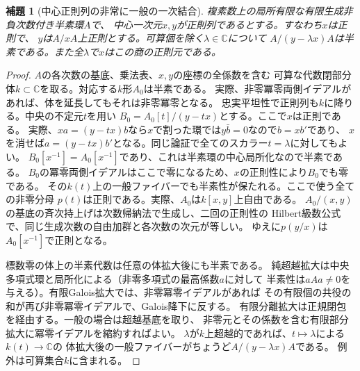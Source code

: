 \documentclass[11pt,a4paper]{ltjsarticle}
\newtheorem{lemma}[theorem]{補題}
\theoremstyle{definition}
\begin{document}
\begin{lemma}[中心正則列の非常に一般の一次結合]
\label{lem:ou-very-general-semiprime-pencil}
複素数上の局所有限な有限生成非負次数付き半素環$A$で、
中心一次元$x,y$が正則列であるとする。すなわち$x$は正則で、
$y$は$A/xA$上正則とする。可算個を除く$\lambda\in\mathbb C$について
$A/(y-\lambda x)A$は半素である。また全$\lambda$で$x$はこの商の正則元である。
\end{lemma}
\begin{proof}
$A$の各次数の基底、乗法表、$x,y$の座標の全係数を含む
可算な代数閉部分体$k\subset\mathbb C$を取る。対応する$k$形$A_0$は半素である。
実際、非零冪零両側イデアルがあれば、体を延長してもそれは非零冪零となる。
忠実平坦性で正則列も$k$に降りる。中央の不定元$t$を用い
$B_0=A_0[t]/(y-tx)$とする。ここで$x$は正則である。
実際、$xa=(y-tx)b$なら$x$で割った環では$y\bar b=0$なので$b=xb'$であり、
$x$を消せば$a=(y-tx)b'$となる。同じ論証で全てのスカラー$t=\lambda$に対してもよい。
$B_0[x^{-1}]=A_0[x^{-1}]$であり、これは半素環の中心局所化なので半素である。
$B_0$の冪零両側イデアルはここで零になるため、$x$の正則性により$B_0$でも零である。
その$k(t)$上の一般ファイバーでも半素性が保たれる。ここで使う全ての非零分母
$p(t)$は正則である。実際、$A_0$は$k[x,y]$上自由である。
$A_0/(x,y)$の基底の斉次持上げは次数帰納法で生成し、二回の正則性の
Hilbert級数公式で、同じ生成次数の自由加群と各次数の次元が等しい。
ゆえに$p(y/x)$は$A_0[x^{-1}]$で正則となる。

標数零の体上の半素代数は任意の体拡大後にも半素である。
純超越拡大は中央多項式環と局所化による（非零多項式の最高係数$a$に対して
半素性は$aAa\ne0$を与える）。有限Galois拡大では、非零冪零イデアルがあれば
その有限個の共役の和が再び非零冪零イデアルで、Galois降下に反する。
有限分離拡大は正規閉包を経由する。一般の場合は超越基底を取り、
非零元とその係数を含む有限部分拡大に冪零イデアルを縮約すればよい。
$\lambda$が$k$上超越的であれば、$t\mapsto\lambda$による$k(t)\to\mathbb C$の
体拡大後の一般ファイバーがちょうど$A/(y-\lambda x)A$である。
例外は可算集合$k$に含まれる。
\end{proof}
\end{document}
